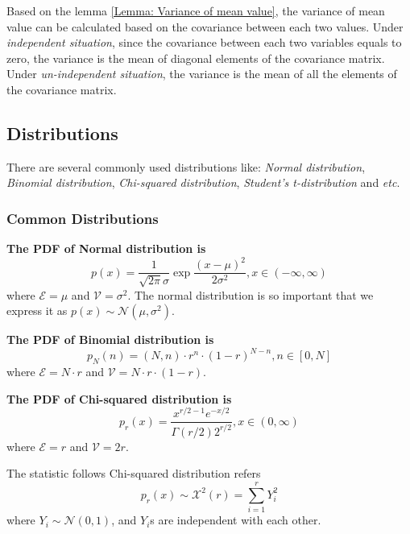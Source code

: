 \documentclass[../main.tex]{subfiles}
\begin{document}
Based on the lemma \ref{Lemma: Variance of mean value}, the variance of mean value can be calculated based on the covariance between each two values.
Under \emph{independent situation}, since the covariance between each two variables equals to zero, the variance is the mean of diagonal elements of the covariance matrix.
Under \emph{un-independent situation}, the variance is the mean of all the elements of the covariance matrix.

\subsection{Distributions}
There are several commonly used distributions like: \emph{Normal distribution}, \emph{Binomial distribution}, \emph{Chi-squared distribution}, \emph{Student's t-distribution} and \textit{etc}.

\subsubsection{Common Distributions}
\bigbreak
\textbf{The PDF of Normal distribution is}
\begin{equation}
    \label{Definition: PDF of Normal distribution}
    p(x)=
    \frac{1}{\sqrt{2\pi}\sigma} \exp{\frac{(x-\mu)^2}{2\sigma^2}},
    x \in (-\infty, \infty)
\end{equation}
where $\mathcal{E}=\mu$ and $\mathcal{V}=\sigma^2$.
The normal distribution is so important that we express it as $p(x) \sim \mathcal{N}(\mu, \sigma^2)$.

\bigbreak
\textbf{The PDF of Binomial distribution is}
\begin{equation}
    \label{Definition: PDF of Binomial distribution}
    p_N(n)=
    (N, n) \cdot r^n \cdot (1-r)^{N-n},
    n \in [0, N]
\end{equation}
where $\mathcal{E}=N \cdot r$ and $\mathcal{V}=N \cdot r \cdot (1-r)$.

\bigbreak
\textbf{The PDF of Chi-squared distribution is}
\begin{equation}
    \label{Definition: PDF of Chi-squared distribution}
    p_r(x)=
    \frac{x^{r/2-1} e^{-x/2}}{\Gamma(r/2) 2^{r/2}},
    x \in (0, \infty)
\end{equation}
where $\mathcal{E}=r$ and $\mathcal{V}=2r$.

The statistic follows Chi-squared distribution refers
\begin{equation*}
    p_r(x) \sim \mathcal{X}^2(r) = \sum_{i=1}^{r} Y_i^2
\end{equation*}
where $Y_i \sim \mathcal{N}(0, 1)$, and $Y_i$s are independent with each other.
\end{document}

